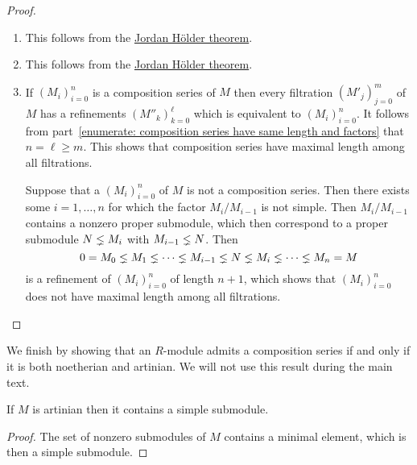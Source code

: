 \begin{proof}
  \leavevmode
  \begin{enumerate}
    \item
      This follows from the \hyperref[theorem: jordan hoelder theorem]{Jordan Hölder theorem}.
    \item
      This follows from the \hyperref[theorem: jordan hoelder theorem]{Jordan Hölder theorem}.
    \item
      If $(M_i)_{i=0}^n$ is a composition series of $M$ then every filtration $(M'_j)_{j=0}^m$ of $M$ has a refinements $(M''_k)_{k=0}^{\ell}$ which is equivalent to $(M_i)_{i=0}^n$.
      It follows from part~\ref*{enumerate: composition series have same length and factors} that $n = \ell \geq m$.
      This shows that composition series have maximal length among all filtrations.
      
      Suppose that a $(M_i)_{i=0}^n$ of $M$ is not a composition series.
      Then there exists some $i = 1, \dotsc, n$ for which the factor $M_i/M_{i-1}$ is not simple.
      Then $M_i/M_{i-1}$ contains a nonzero proper submodule, which then correspond to a proper submodule $N \lneq M_i$ with $M_{i-1} \lneq N$.
      Then
      \[
                    0
        =           M_0
        \lneq M_1
        \lneq \dotsb
        \lneq M_{i-1}
        \lneq N
        \lneq M_i
        \lneq \dotsb
        \lneq M_n
        =           M
      \]
      is a refinement of $(M_i)_{i=0}^n$ of length $n+1$, which shows that $(M_i)_{i=0}^n$ does not have maximal length among all filtrations.
    \qedhere
  \end{enumerate}
\end{proof}


\begin{fluff}
  We finish by showing that an $R$-module admits a composition series if and only if it is both noetherian and artinian.
  We will not use this result during the main text.
\end{fluff}


\begin{lemma}
  \label{lemma: artinian contains simple}
  If $M$ is artinian then it contains a simple submodule.
\end{lemma}


\begin{proof}
  The set of nonzero submodules of $M$ contains a minimal element, which is then a simple submodule.
\end{proof}


